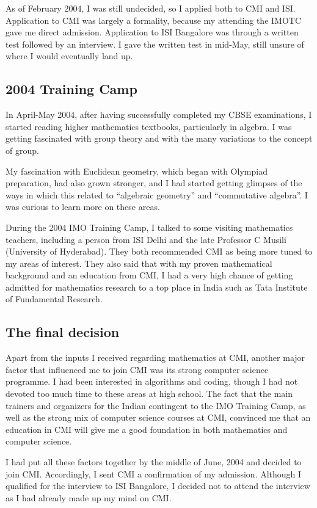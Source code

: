 \documentclass[a4paper]{amsart}
\begin{document}
As of February 2004, I was still undecided, so I applied both to CMI
and ISI. Application to CMI was largely a formality, because my
attending the IMOTC gave me direct admission. Application to ISI Bangalore
was through a written test followed by an interview. I gave the written test in mid-May,
still unsure of where I would eventually land up.

\subsection{2004 Training Camp}

In April-May 2004, after having successfully completed my CBSE
examinations, I started reading higher mathematics textbooks,
particularly in algebra. I was getting fascinated with group theory
and with the many variations to the concept of group.

My fascination with Euclidean geometry, which began with Olympiad
preparation, had also grown stronger, and I had started getting
glimpses of the ways in which this related to ``algebraic geometry''
and ``commutative algebra''. I was curious to learn more on these
areas.

During the 2004 IMO Training Camp, I talked to some visiting
mathematics teachers, including a person from ISI Delhi and the late
Professor C Musili (University of Hyderabad).  They both recommended
CMI as being more tuned to my areas of interest. They also said that
with my proven mathematical background and an education from CMI, I
had a very high chance of getting admitted for mathematics research to a top place
in India such as Tata Institute of Fundamental Research.

\subsection{The final decision}

Apart from the inputs I received regarding mathematics at CMI, another
major factor that influenced me to join CMI was its strong computer
science programme. I had been interested in algorithms and coding,
though I had not devoted too much time to these areas at high school. The fact
that the main trainers and organizers for the Indian contingent to the IMO Training Camp,
as well as the strong mix of computer science courses at CMI, convinced me that an education
in CMI will give me a good foundation in both mathematics and computer science.

I had put all these factors together by the middle of June, 2004 and
decided to join CMI. Accordingly, I sent CMI a confirmation of my
admission. Although I qualified for the interview to ISI Bangalore, I
decided not to attend the interview as I had already made up my mind
on CMI.





\printindex
\end{document}
